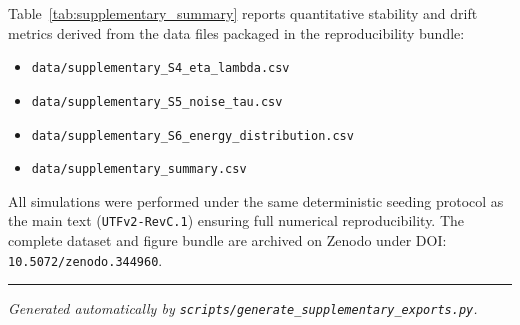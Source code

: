 \noindent
Table~\ref{tab:supplementary_summary} reports quantitative stability and drift metrics derived
from the data files packaged in the reproducibility bundle:
\begin{itemize}
    \item \texttt{data/supplementary\_S4\_eta\_lambda.csv}
    \item \texttt{data/supplementary\_S5\_noise\_tau.csv}
    \item \texttt{data/supplementary\_S6\_energy\_distribution.csv}
    \item \texttt{data/supplementary\_summary.csv}
\end{itemize}

All simulations were performed under the same deterministic seeding protocol
as the main text (\texttt{UTFv2-RevC.1}) ensuring full numerical reproducibility.
The complete dataset and figure bundle are archived on Zenodo under DOI: \texttt{10.5072/zenodo.344960}.

\vspace{2em}
\hrule
\vspace{1em}
\textit{Generated automatically by \texttt{scripts/generate\_supplementary\_exports.py}.}